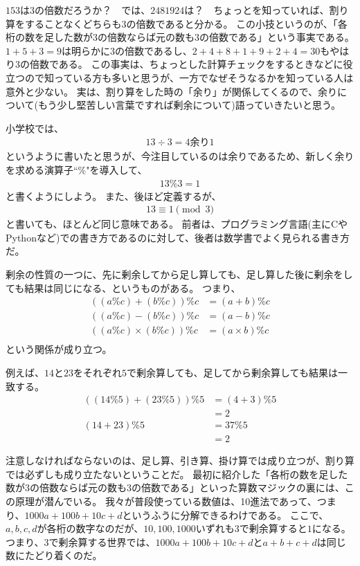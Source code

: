 $153$は$3$の倍数だろうか？　では、$2481924$は？　ちょっとを知っていれば、割り算をすることなくどちらも$3$の倍数であると分かる。
この小技というのが、「各桁の数を足した数が$3$の倍数ならば元の数も$3$の倍数である」という事実である。
$1+5+3=9$は明らかに$3$の倍数であるし、$2+4+8+1+9+2+4=30$もやはり$3$の倍数である。
この事実は、ちょっとした計算チェックをするときなどに役立つので知っている方も多いと思うが、一方でなぜそうなるかを知っている人は意外と少ない。
実は、割り算をした時の「余り」が関係してくるので、余りについて(もう少し堅苦しい言葉ですれば剰余について)語っていきたいと思う。

小学校では、
\begin{align*}
13 \div 3 = 4 \mbox{余り} 1
\end{align*}
というように書いたと思うが、今注目しているのは余りであるため、新しく余りを求める演算子``$\%$"を導入して、
\begin{align*}
13 \% 3 = 1
\end{align*}
と書くようにしよう。
また、後ほど定義するが、
\begin{align*}
13 \equiv 1 \pmod{3}
\end{align*}
と書いても、ほとんど同じ意味である。
前者は、プログラミング言語(主にCやPythonなど)での書き方であるのに対して、後者は数学書でよく見られる書き方だ。

剰余の性質の一つに、先に剰余してから足し算しても、足し算した後に剰余をしても結果は同じになる、というものがある。
つまり、
\begin{align*}
((a \% c) + (b \% c)) \% c &= (a + b) \% c\\
((a \% c) - (b \% c)) \% c &= (a - b) \% c\\
((a \% c) \times (b \% c)) \% c &= (a \times b) \% c\\
\end{align*}
という関係が成り立つ。

例えば、$14$と$23$をそれぞれ$5$で剰余算しても、足してから剰余算しても結果は一致する。
\begin{align*}
((14 \% 5) + (23 \% 5)) \% 5 &= (4 + 3) \% 5\\
&= 2\\
(14 + 23) \% 5 &= 37 \% 5\\
&= 2
\end{align*}

注意しなければならないのは、足し算、引き算、掛け算では成り立つが、割り算では必ずしも成り立たないということだ。
最初に紹介した「各桁の数を足した数が$3$の倍数ならば元の数も$3$の倍数である」といった算数マジックの裏には、この原理が潜んでいる。
我々が普段使っている数値は、10進法であって、つまり、$1000a + 100b + 10c + d$というふうに分解できるわけである。
ここで、$a,b,c,d$が各桁の数字なのだが、$10, 100, 1000$いずれも$3$で剰余算すると$1$になる。
つまり、$3$で剰余算する世界では、$1000a + 100b + 10c + d$と$a + b + c + d$は同じ数にたどり着くのだ。

